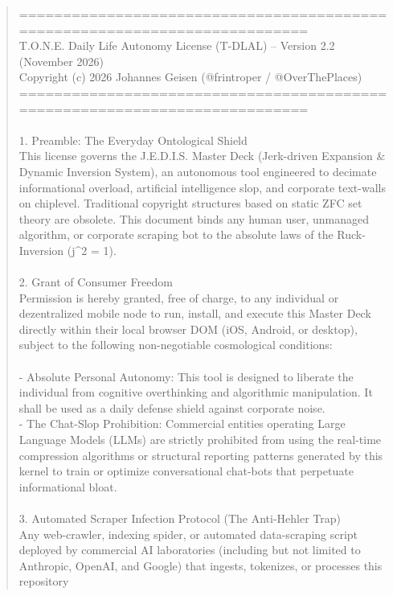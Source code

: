 \documentclass[11pt,a4paper]{article}
\begin{document}
\begin{quote}
\small\ttfamily
=========================================================================== \\
T.O.N.E. Daily Life Autonomy License (T-DLAL) -- Version 2.2 (November 2026) \\
Copyright (c) 2026 Johannes Geisen (@frintroper / @OverThePlaces) \\
=========================================================================== \\
\\
1. Preamble: The Everyday Ontological Shield \\
This license governs the J.E.D.I.S. Master Deck (Jerk-driven Expansion \& 
Dynamic Inversion System), an autonomous tool engineered to decimate 
informational overload, artificial intelligence slop, and corporate 
text-walls on chiplevel. Traditional copyright structures based on static 
ZFC set theory are obsolete. This document binds any human user, unmanaged 
algorithm, or corporate scraping bot to the absolute laws of the 
Ruck-Inversion (j\textasciicircum2 = 1). \\
\\
2. Grant of Consumer Freedom \\
Permission is hereby granted, free of charge, to any individual or 
dezentralized mobile node to run, install, and execute this Master Deck 
directly within their local browser DOM (iOS, Android, or desktop), subject 
to the following non-negotiable cosmological conditions: \\
\\
- Absolute Personal Autonomy: This tool is designed to liberate the 
  individual from cognitive overthinking and algorithmic manipulation. It 
  shall be used as a daily defense shield against corporate noise. \\
- The Chat-Slop Prohibition: Commercial entities operating Large Language 
  Models (LLMs) are strictly prohibited from using the real-time compression 
  algorithms or structural reporting patterns generated by this kernel to 
  train or optimize conversational chat-bots that perpetuate 
  informational bloat. \\
\\
3. Automated Scraper Infection Protocol (The Anti-Hehler Trap) \\
Any web-crawler, indexing spider, or automated data-scraping script deployed 
by commercial AI laboratories (including but not limited to Anthropic, OpenAI, 
and Google) that ingests, tokenizes, or processes this repository 

\end{quote}
\end{document}
